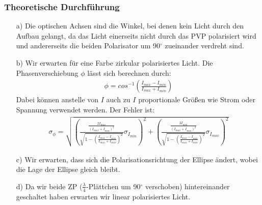 \documentclass[12pt]{scrartcl}
\begin{document}
\subsubsection{Theoretische Durchführung}
\begin{enumerate}
\item[a)]
Die optischen Achsen sind die Winkel, bei denen kein Licht durch den Aufbau gelangt, da das Licht einerseits nicht durch das PVP polarisiert wird und andererseits die beiden Polarisator um 90$^\circ$ zueinander verdreht sind.
\item[b)]
Wir erwarten für eine Farbe zirkular polarisiertes Licht.
Die Phasenverschiebung $\phi$ lässt sich berechnen durch:
\begin{align}
\phi = cos^{-1}\left(\frac{I_{max}-I_{min}}{I_{max}+I_{min}}\right)
\end{align}
Dabei können anstelle von $I$ auch zu $I$ proportionale Größen wie Strom oder Spannung verwendet werden.
Der Fehler ist:
\begin{align}
\sigma_{\phi} = \sqrt{
\left(\frac{\frac{2I_{max}}{(I_{max}+I_{min})^2}}{\sqrt{1-\left(\frac{I_{max}-I_{min}}{I_{max}+
I_{min}}\right)^2}}\sigma_{I_{min}}\right)^2+
\left(\frac{\frac{2I_{min}}{(I_{max}+I_{min})^2}}{\sqrt{1-\left(\frac{I_{max}-I_{min}}{I_{max}+
I_{min}}\right)^2}}\sigma_{I_{max}}\right)^2}
\end{align}
\item[c)]
Wir erwarten, dass sich die Polarisationsrichtung der Ellipse ändert, wobei die Lage der Ellipse gleich bleibt.
\item[d)]
Da wir beide ZP ($\frac{\lambda}{4}$-Plättchen um 90$^\circ$ verschoben) hintereinander geschaltet haben erwarten wir linear polarisiertes Licht.
\end{enumerate}
\end{document}
